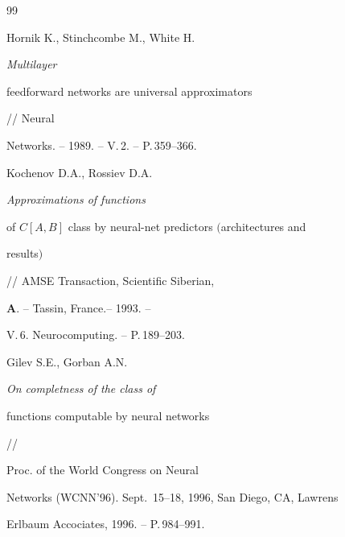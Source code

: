 \begin{thebibliography}{99}


Hornik K., Stinchcombe M., White H. {\em Multilayer


feedforward networks are universal approximators} // Neural


Networks. -- 1989. -- V.\,2. -- P.\,359--366.




Kochenov D.A., Rossiev D.A. {\em Approximations of functions


of $C[A,B]$ class by neural-net predictors $($architectures and


results$)$} // AMSE Transaction, Scientific Siberian,


{\bf A}. -- Tassin, France.-- 1993. --


V.\,6. Neurocomputing. -- P.\,189--203. 




Gilev S.E., Gorban A.N. {\em On completness of the class of


functions computable by neural networks} //


Proc. of the World Congress on Neural


Networks (WCNN'96). Sept.~15--18, 1996, San Diego, CA, Lawrens


Erlbaum Accociates, 1996. -- P.\,984--991.





\end{thebibliography}





\vskip 0.5cm












\label{end}





